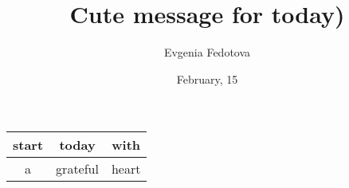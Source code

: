 \documentclass[12pt]{article}
\title{Cute message for today)}
\author{Evgenia Fedotova}
\date{February, 15}
\begin{document}
\maketitle

\begin{tabular}{|| c | c | c ||}
\hline 
start & today & with \\ 
\hline 
a & grateful & heart \\ 
\hline
\end{tabular} \\
\end{document}
